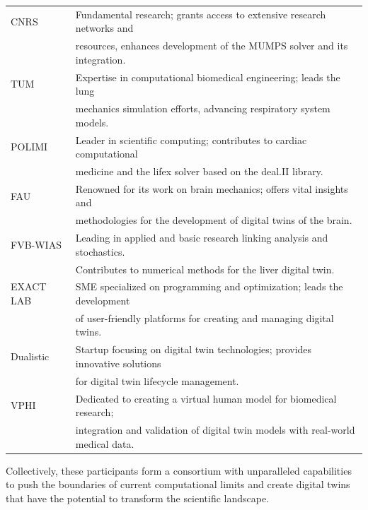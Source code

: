 \documentclass[a4paper,12pt]{article}
\begin{document}
\begin{center}
\begin{longtable}{|l|l|}
    CNRS & 
    Fundamental research; grants access to extensive research networks and\\
    & resources, enhances development of the MUMPS solver and its integration. 
    \\
    TUM & 
    Expertise in computational biomedical engineering; leads the lung\\
    & mechanics simulation efforts, advancing respiratory system models. 
    \\
    POLIMI & 
    Leader in scientific computing; contributes to cardiac computational\\
    & medicine and the lifex solver based on the deal.II library.
    \\
    FAU & 
    Renowned for its work on brain mechanics; offers vital insights and\\
    & methodologies for the development of digital twins of the brain.
    \\
    FVB-WIAS & 
    Leading in applied and basic research linking analysis and stochastics.\\
    & Contributes to numerical methods for the liver digital twin.
    \\
    EXACT LAB & 
    SME specialized on programming and optimization; leads the development\\
    & of user-friendly platforms for creating and managing digital twins.
    \\
    Dualistic & 
    Startup focusing on digital twin technologies; provides innovative solutions 
    \\
    & for digital twin lifecycle management. %
    \\
    VPHI & 
    Dedicated to creating a virtual human model for biomedical research;\\
    & integration and validation of digital twin models with real-world medical data. 
    \\
    \hline
    \end{longtable}
\end{center}
Collectively, these participants form a consortium with unparalleled capabilities to push the boundaries of current computational limits and create digital twins that have the potential to transform the scientific landscape.
\end{document}
